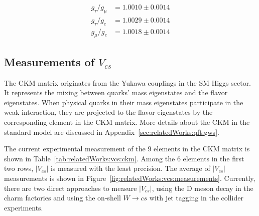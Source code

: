 \begin{align*}
    g_\tau / g_\mu &= 1.0010 \pm 0.0014 \\
    g_\tau / g_e   &= 1.0029 \pm 0.0014 \\
    g_\mu  / g_e   &= 1.0018 \pm 0.0014 
\end{align*}





\subsection{Measurements of $V_{cs}$ }
\label{sec:relatedWorks:vcsMeasurements}

The CKM matrix originates from the Yukawa couplings in the SM Higgs sector. It represents the mixing between quarks' mass eigenstates and the flavor eigenstates. When physical quarks in their mass eigenstates participate in the weak interaction, they are projected to the flavor eigenstates by the corresponding element in the CKM matrix. More details about the CKM in the standard model are discussed in Appendix~\ref{sec:relatedWorks:qft:gws}. 

\begin{table}[ht]
    \centering
    \setlength{\tabcolsep}{1.5em}
    \renewcommand{\arraystretch}{1.5}
    \caption{The current experimental world average of the 9 elements in the CKM matrix in the PDG \cite{pdg2020}.  }
    \label{tab:relatedWorks:vcs:ckm}
\end{table}


The current experimental measurement of the 9 elements in the CKM matrix \cite{pdg2020} is shown in Table~\ref{tab:relatedWorks:vcs:ckm}. Among the 6 elements in the first two rows, $|V_{cs}|$ is measured with the least precision. The average of $|V_{cs}|$ measurements is shown in Figure~\ref{fig:relatedWorks:vcs:measurements}. Currently, there are two direct approaches to measure $|V_{cs}|$, using the D meson decay in the charm factories and using the on-shell $W\to c s$  with jet tagging in the collider experiments.

